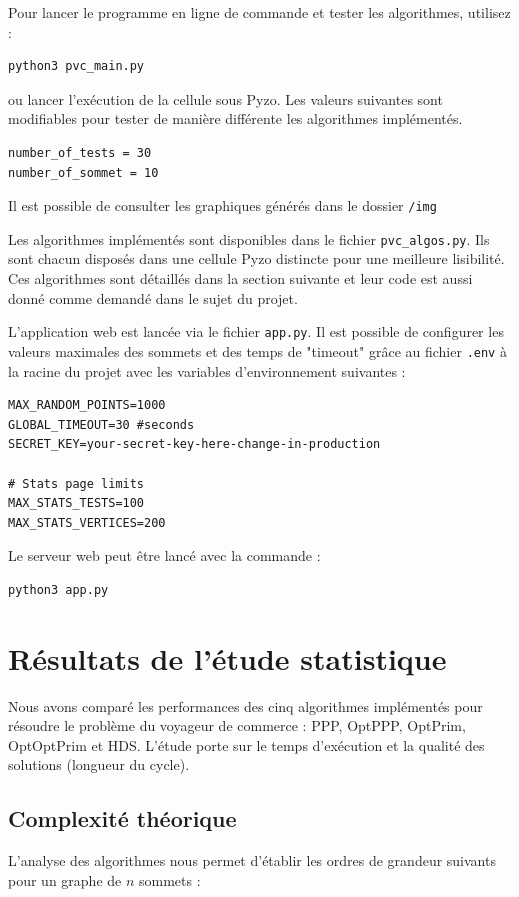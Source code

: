 \documentclass[a4paper, 12pt]{article}
\begin{document}
Pour lancer le programme en ligne de commande et tester les algorithmes, utilisez :
\begin{lstlisting}
python3 pvc_main.py
\end{lstlisting}
ou lancer l'exécution de la cellule sous Pyzo. Les valeurs suivantes sont modifiables pour tester de manière différente les algorithmes implémentés. 
\begin{lstlisting}
number_of_tests = 30
number_of_sommet = 10
\end{lstlisting}
Il est possible de consulter les graphiques générés dans le dossier \texttt{/img}

Les algorithmes implémentés sont disponibles dans le fichier \texttt{pvc\_algos.py}. Ils sont chacun disposés dans une cellule Pyzo distincte pour une meilleure lisibilité. Ces algorithmes sont détaillés dans la section suivante et leur code est aussi donné comme demandé dans le sujet du projet.

L'application web est lancée via le fichier \texttt{app.py}. Il est possible de configurer les valeurs maximales des sommets et des temps de "timeout" grâce au fichier \texttt{.env} à la racine du projet avec les variables d'environnement suivantes :
\begin{lstlisting}
MAX_RANDOM_POINTS=1000
GLOBAL_TIMEOUT=30 #seconds
SECRET_KEY=your-secret-key-here-change-in-production

# Stats page limits
MAX_STATS_TESTS=100
MAX_STATS_VERTICES=200
\end{lstlisting}
Le serveur web peut être lancé avec la commande :
\begin{lstlisting}
python3 app.py
\end{lstlisting}

\section{Résultats de l'étude statistique}

Nous avons comparé les performances des cinq algorithmes implémentés pour résoudre le problème du voyageur de commerce : PPP, OptPPP, OptPrim, OptOptPrim et HDS. L'étude porte sur le temps d'exécution et la qualité des solutions (longueur du cycle).

\subsection{Complexité théorique}

L'analyse des algorithmes nous permet d'établir les ordres de grandeur suivants pour un graphe de $n$ sommets :
\end{document}
